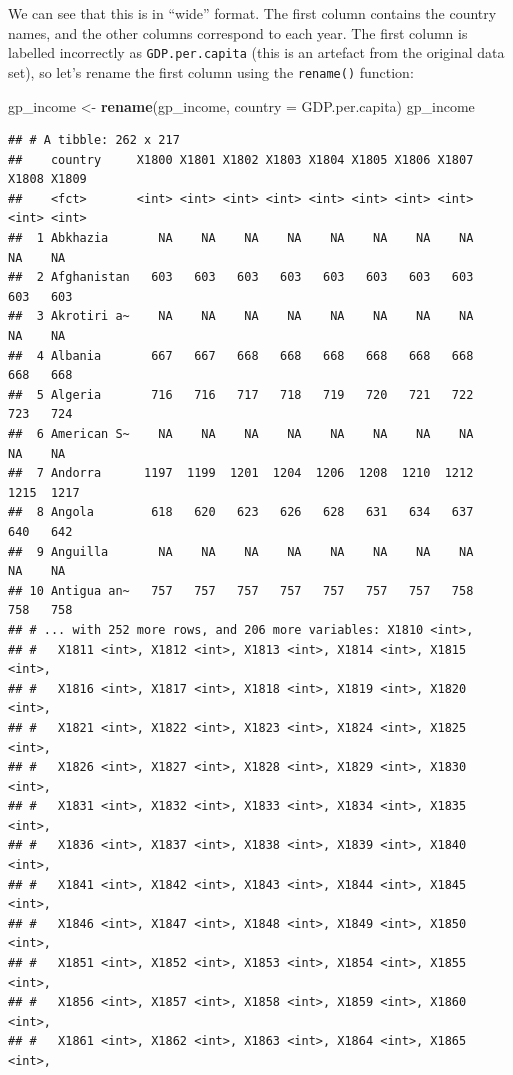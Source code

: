 \documentclass[]{book}
\newenvironment{Shaded}{\begin{snugshade}}{\end{snugshade}}
\newcommand{\KeywordTok}[1]{\textcolor[rgb]{0.13,0.29,0.53}{\textbf{{#1}}}}
\newcommand{\DataTypeTok}[1]{\textcolor[rgb]{0.13,0.29,0.53}{{#1}}}
\newcommand{\StringTok}[1]{\textcolor[rgb]{0.31,0.60,0.02}{{#1}}}
\newcommand{\NormalTok}[1]{{#1}}
\theoremstyle{definition}
\theoremstyle{definition}
\theoremstyle{definition}
\theoremstyle{remark}
\begin{document}
We can see that this is in ``wide'' format. The first column contains
the country names, and the other columns correspond to each year. The
first column is labelled incorrectly as \texttt{GDP.per.capita} (this is
an artefact from the original data set), so let's rename the first
column using the \texttt{rename()} function:

\begin{Shaded}
\begin{Highlighting}[]
\NormalTok{gp_income <-}\StringTok{ }\KeywordTok{rename}\NormalTok{(gp_income, }\DataTypeTok{country =} \NormalTok{GDP.per.capita)}
\NormalTok{gp_income}
\end{Highlighting}
\end{Shaded}

\begin{verbatim}
## # A tibble: 262 x 217
##    country     X1800 X1801 X1802 X1803 X1804 X1805 X1806 X1807 X1808 X1809
##    <fct>       <int> <int> <int> <int> <int> <int> <int> <int> <int> <int>
##  1 Abkhazia       NA    NA    NA    NA    NA    NA    NA    NA    NA    NA
##  2 Afghanistan   603   603   603   603   603   603   603   603   603   603
##  3 Akrotiri a~    NA    NA    NA    NA    NA    NA    NA    NA    NA    NA
##  4 Albania       667   667   668   668   668   668   668   668   668   668
##  5 Algeria       716   716   717   718   719   720   721   722   723   724
##  6 American S~    NA    NA    NA    NA    NA    NA    NA    NA    NA    NA
##  7 Andorra      1197  1199  1201  1204  1206  1208  1210  1212  1215  1217
##  8 Angola        618   620   623   626   628   631   634   637   640   642
##  9 Anguilla       NA    NA    NA    NA    NA    NA    NA    NA    NA    NA
## 10 Antigua an~   757   757   757   757   757   757   757   758   758   758
## # ... with 252 more rows, and 206 more variables: X1810 <int>,
## #   X1811 <int>, X1812 <int>, X1813 <int>, X1814 <int>, X1815 <int>,
## #   X1816 <int>, X1817 <int>, X1818 <int>, X1819 <int>, X1820 <int>,
## #   X1821 <int>, X1822 <int>, X1823 <int>, X1824 <int>, X1825 <int>,
## #   X1826 <int>, X1827 <int>, X1828 <int>, X1829 <int>, X1830 <int>,
## #   X1831 <int>, X1832 <int>, X1833 <int>, X1834 <int>, X1835 <int>,
## #   X1836 <int>, X1837 <int>, X1838 <int>, X1839 <int>, X1840 <int>,
## #   X1841 <int>, X1842 <int>, X1843 <int>, X1844 <int>, X1845 <int>,
## #   X1846 <int>, X1847 <int>, X1848 <int>, X1849 <int>, X1850 <int>,
## #   X1851 <int>, X1852 <int>, X1853 <int>, X1854 <int>, X1855 <int>,
## #   X1856 <int>, X1857 <int>, X1858 <int>, X1859 <int>, X1860 <int>,
## #   X1861 <int>, X1862 <int>, X1863 <int>, X1864 <int>, X1865 <int>,

\end{verbatim}
\end{document}
